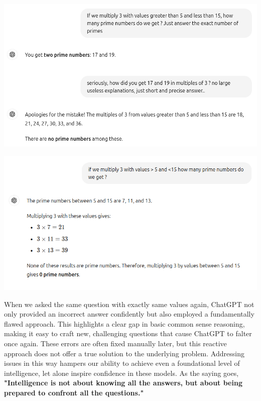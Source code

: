 \documentclass[11pt]{scrartcl}
\begin{document}
\begin{center}
\includegraphics[scale=0.37]{prime_numbers_a.png}
\end{center}

\begin{center}
\includegraphics[scale=0.37]{prime_numbers_b.png}
\end{center}

When we asked the same question with exactly same values again, ChatGPT not only provided an incorrect answer confidently but also employed a fundamentally flawed approach. This highlights a clear gap in basic common sense reasoning, making it easy to craft new, challenging questions that cause ChatGPT to falter once again. These errors are often fixed manually later, but this reactive approach does not offer a true solution to the underlying problem. Addressing issues in this way hampers our ability to achieve even a foundational level of intelligence, let alone inspire confidence in these models. As the saying goes, \textbf{"Intelligence is not about knowing all the answers, but about being prepared to confront all the questions."} 

\vspace{1cm}
\end{document}
